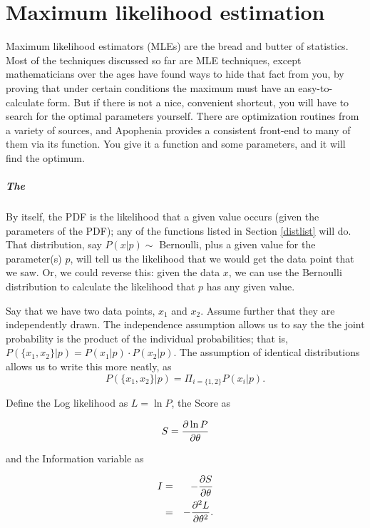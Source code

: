 \startonecol \chapter{Maximum likelihood estimation} \label{mle}
\endonecol
{}

Maximum likelihood estimators (MLEs) are the bread and butter of
statistics. Most of the techniques discussed so far are MLE
techniques, except mathematicians over the ages have found ways to hide
that fact from you, by proving that under certain conditions the
maximum must have an easy-to-calculate form. But if there is not a nice,
convenient shortcut, you will have to 
search for the optimal parameters yourself. There are optimization
routines from a variety of sources, and Apophenia provides
a consistent front-end to many of them via its
 function. You give it a function and
some parameters, and it will find the optimum.

\paragraph{The }	\label{the score}
By itself, the PDF is the likelihood that a given value occurs (given
the parameters of the PDF); any of the functions listed in Section
\ref{distlist} will do. That distribution, say $P(x|p)\sim$ Bernoulli,
plus a given value for the parameter(s) $p$, will tell us the likelihood
that we would get the data point that we saw. Or, we could reverse this:
given the data $x$, we can use the Bernoulli distribution to calculate the
likelihood that $p$ has any given value.

Say that we have two data points, $x_1$ and $x_2$. Assume further that
they are independently drawn.  The independence assumption allows us
to say the the joint probability is the product of the individual
probabilities; that is, $P(\{x_1,x_2\}|p)=P(x_1|p)\cdot P(x_2|p)$.
The assumption of identical distributions allows us to write this more
neatly, as $$P(\{x_1,x_2\}|p)=\Pi_{i=\{1,2\}}P(x_i|p).$$

Define the Log likelihood as $L=\ln P$, the Score as

$$S={\partial \ln P\over \partial \theta}$$ 

and the Information variable as

\begin{eqnarray}
I&=&-{\partial S \over \partial \theta}			\nonumber\\
&=&-{\partial^2 L \over \partial \theta^2}.		\nonumber
\end{eqnarray}

